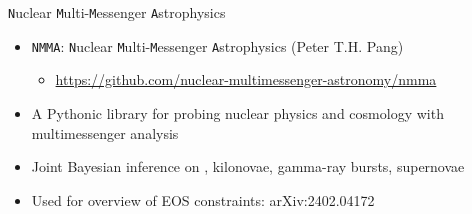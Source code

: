 \documentclass[usenames,dvipsnames,t]{beamer}
\begin{document}




\begin{frame}{\texttt{N}uclear \texttt{M}ulti-\texttt{M}essenger \texttt{A}strophysics}

  \def\x{7mm}
  \def\y{3mm}
  
  \begin{itemize}
    \item \texttt{NMMA}: \texttt{N}uclear \texttt{M}ulti-\texttt{M}essenger \texttt{A}strophysics (Peter T.H. Pang) 
    
    \vspace{\y}
    \begin{itemize}
      \item \url{https://github.com/nuclear-multimessenger-astronomy/nmma}
      
    \end{itemize}
    
    \vspace{\x}

    \item A Pythonic library for probing nuclear physics and cosmology with multimessenger analysis
    
    \vspace{\x}

    \item Joint Bayesian inference on , kilonovae, gamma-ray bursts, supernovae
    
    \vspace{\x}

    \item Used for overview of EOS constraints: arXiv:2402.04172
  \end{itemize}
  
  \end{frame}
\end{document}
